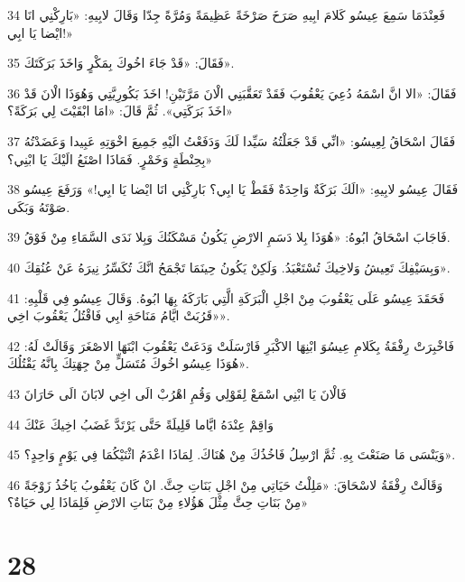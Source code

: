 \par 34 فَعِنْدَمَا سَمِعَ عِيسُو كَلامَ ابِيهِ صَرَخَ صَرْخَةً عَظِيمَةً وَمُرَّةً جِدّا وَقَالَ لابِيهِ: «بَارِكْنِي انَا ايْضا يَا ابِي!»
\par 35 فَقَالَ: «قَدْ جَاءَ اخُوكَ بِمَكْرٍ وَاخَذَ بَرَكَتَكَ».
\par 36 فَقَالَ: «الا انَّ اسْمَهُ دُعِيَ يَعْقُوبَ فَقَدْ تَعَقَّبَنِي الْانَ مَرَّتَيْنِ! اخَذَ بَكُورِيَّتِي وَهُوَذَا الْانَ قَدْ اخَذَ بَرَكَتِي». ثُمَّ قَالَ: «امَا ابْقَيْتَ لِي بَرَكَةً؟»
\par 37 فَقَالَ اسْحَاقُ لِعِيسُو: «انِّي قَدْ جَعَلْتُهُ سَيِّدا لَكَ وَدَفَعْتُ الَيْهِ جَمِيعَ اخْوَتِهِ عَبِيدا وَعَضَدْتُهُ بِحِنْطَةٍ وَخَمْرٍ. فَمَاذَا اصْنَعُ الَيْكَ يَا ابْنِي؟»
\par 38 فَقَالَ عِيسُو لابِيهِ: «الَكَ بَرَكَةٌ وَاحِدَةٌ فَقَطْ يَا ابِي؟ بَارِكْنِي انَا ايْضا يَا ابِي!» وَرَفَعَ عِيسُو صَوْتَهُ وَبَكَى.
\par 39 فَاجَابَ اسْحَاقُ ابُوهُ: «هُوَذَا بِلا دَسَمِ الارْضِ يَكُونُ مَسْكَنُكَ وَبِلا نَدَى السَّمَاءِ مِنْ فَوْقُ.
\par 40 وَبِسَيْفِكَ تَعِيشُ وَلاخِيكَ تُسْتَعْبَدُ. وَلَكِنْ يَكُونُ حِينَمَا تَجْمَحُ انَّكَ تُكَسِّرُ نِيرَهُ عَنْ عُنُقِكَ».
\par 41 فَحَقَدَ عِيسُو عَلَى يَعْقُوبَ مِنْ اجْلِ الْبَرَكَةِ الَّتِي بَارَكَهُ بِهَا ابُوهُ. وَقَالَ عِيسُو فِي قَلْبِهِ: «قَرُبَتْ ايَّامُ مَنَاحَةِ ابِي فَاقْتُلُ يَعْقُوبَ اخِي».
\par 42 فَاخْبِرَتْ رِفْقَةُ بِكَلامِ عِيسُوَ ابْنِهَا الاكْبَرِ فَارْسَلَتْ وَدَعَتْ يَعْقُوبَ ابْنَهَا الاصْغَرَ وَقَالَتْ لَهُ: «هُوَذَا عِيسُو اخُوكَ مُتَسَلٍّ مِنْ جِهَتِكَ بِانَّهُ يَقْتُلُكَ.
\par 43 فَالْانَ يَا ابْنِي اسْمَعْ لِقَوْلِي وَقُمِ اهْرُبْ الَى اخِي لابَانَ الَى حَارَانَ
\par 44 وَاقِمْ عِنْدَهُ ايَّاما قَلِيلَةً حَتَّى يَرْتَدَّ غَضَبُ اخِيكَ عَنْكَ
\par 45 وَيَنْسَى مَا صَنَعْتَ بِهِ. ثُمَّ ارْسِلُ فَاخُذُكَ مِنْ هُنَاكَ. لِمَاذَا اعْدَمُ اثْنَيْكُمَا فِي يَوْمٍ وَاحِدٍ؟».
\par 46 وَقَالَتْ رِفْقَةُ لاسْحَاقَ: «مَلِلْتُ حَيَاتِي مِنْ اجْلِ بَنَاتِ حِثَّ. انْ كَانَ يَعْقُوبُ يَاخُذُ زَوْجَةً مِنْ بَنَاتِ حِثَّ مِثْلَ هَؤُلاءِ مِنْ بَنَاتِ الارْضِ فَلِمَاذَا لِي حَيَاةٌ؟»

\chapter{28}

